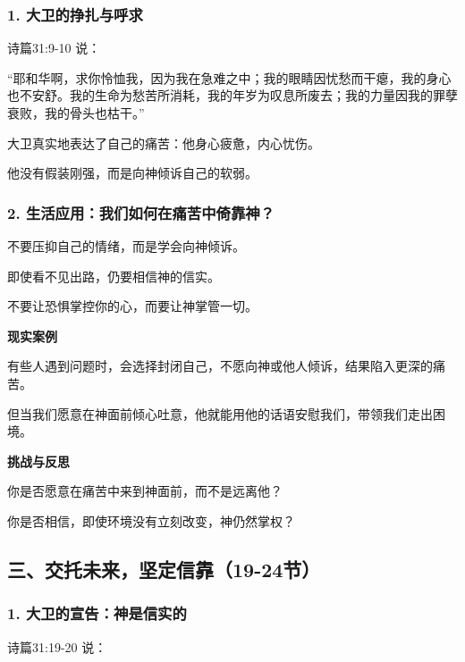 \documentclass[a4paper, 12pt]{article}
\begin{document}
\subsubsection*{1. 大卫的挣扎与呼求}
\hspace{0.6cm}诗篇31:9-10 说：

“耶和华啊，求你怜恤我，因为我在急难之中；我的眼睛因忧愁而干瘪，我的身心也不安舒。我的生命为愁苦所消耗，我的年岁为叹息所废去；我的力量因我的罪孽衰败，我的骨头也枯干。”

大卫真实地表达了自己的痛苦：他身心疲惫，内心忧伤。

他没有假装刚强，而是向神倾诉自己的软弱。
\subsubsection*{2. 生活应用：我们如何在痛苦中倚靠神？}

\hspace{0.6cm}不要压抑自己的情绪，而是学会向神倾诉。

即使看不见出路，仍要相信神的信实。

不要让恐惧掌控你的心，而要让神掌管一切。

\vspace{0.2cm}

\textbf{现实案例}

\hspace{0.6cm}有些人遇到问题时，会选择封闭自己，不愿向神或他人倾诉，结果陷入更深的痛苦。

\hspace{0.6cm}但当我们愿意在神面前倾心吐意，他就能用他的话语安慰我们，带领我们走出困境。

\vspace{0.2cm}

\textbf{挑战与反思}

\hspace{0.6cm}你是否愿意在痛苦中来到神面前，而不是远离他？

\hspace{0.6cm}你是否相信，即使环境没有立刻改变，神仍然掌权？
\subsection*{三、交托未来，坚定信靠（19-24节）}
\subsubsection*{1. 大卫的宣告：神是信实的}
\hspace{0.6cm}诗篇31:19-20 说：
\end{document}
